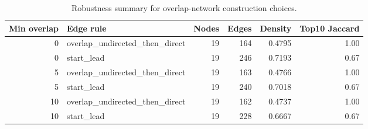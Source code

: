 \begin{table}[ht]
\centering
\small
\begin{tabular}{r l r r r r}
\hline
Min overlap & Edge rule & Nodes & Edges & Density & Top10 Jaccard \\
\hline
0 & overlap\_undirected\_then\_direct & 19 & 164 & 0.4795 & 1.00 \\
0 & start\_lead & 19 & 246 & 0.7193 & 0.67 \\
5 & overlap\_undirected\_then\_direct & 19 & 163 & 0.4766 & 1.00 \\
5 & start\_lead & 19 & 240 & 0.7018 & 0.67 \\
10 & overlap\_undirected\_then\_direct & 19 & 162 & 0.4737 & 1.00 \\
10 & start\_lead & 19 & 228 & 0.6667 & 0.67 \\
\hline
\end{tabular}
\caption{Robustness summary for overlap-network construction choices.}
\label{tab:robustness_summary}
\end{table}

